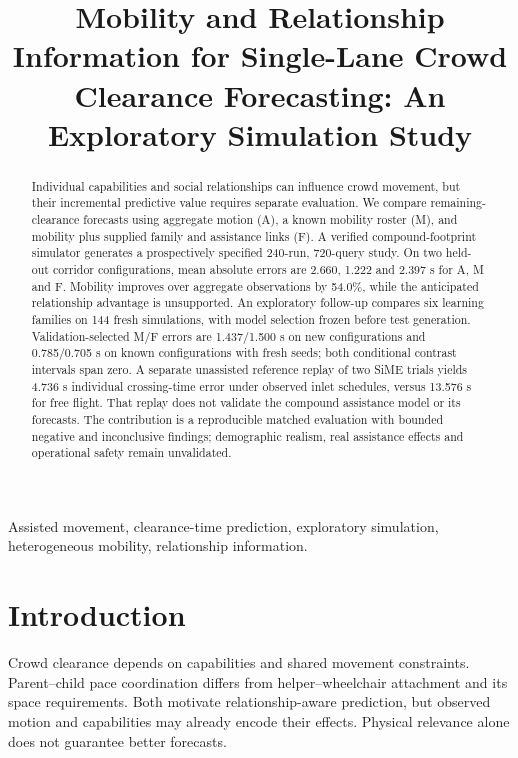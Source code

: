 \documentclass[conference]{IEEEtran}
\begin{document}
\title{Mobility and Relationship Information for Single-Lane Crowd Clearance Forecasting: An Exploratory Simulation Study}
\author{
}
\maketitle
\begin{abstract}
Individual capabilities and social relationships can influence crowd movement, but their incremental predictive value requires separate evaluation. We compare remaining-clearance forecasts using aggregate motion (A), a known mobility roster (M), and mobility plus supplied family and assistance links (F). A verified compound-footprint simulator generates a prospectively specified 240-run, 720-query study. On two held-out corridor configurations, mean absolute errors are 2.660, 1.222 and 2.397 s for A, M and F. Mobility improves over aggregate observations by 54.0\%, while the anticipated relationship advantage is unsupported. An exploratory follow-up compares six learning families on 144 fresh simulations, with model selection frozen before test generation. Validation-selected M/F errors are 1.437/1.500 s on new configurations and 0.785/0.705 s on known configurations with fresh seeds; both conditional contrast intervals span zero. A separate unassisted reference replay of two SiME trials yields 4.736 s individual crossing-time error under observed inlet schedules, versus 13.576 s for free flight. That replay does not validate the compound assistance model or its forecasts. The contribution is a reproducible matched evaluation with bounded negative and inconclusive findings; demographic realism, real assistance effects and operational safety remain unvalidated.
\end{abstract}
\begin{IEEEkeywords}
Assisted movement, clearance-time prediction, exploratory simulation, heterogeneous mobility, relationship information.
\end{IEEEkeywords}
\section{Introduction}
Crowd clearance depends on capabilities and shared movement constraints. Parent--child pace coordination differs from helper--wheelchair attachment and its space requirements. Both motivate relationship-aware prediction, but observed motion and capabilities may already encode their effects. Physical relevance alone does not guarantee better forecasts.
\end{document}
